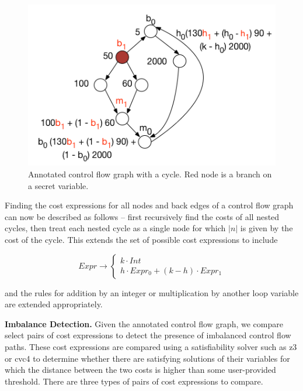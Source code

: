 \begin{figure}
  \includegraphics[scale=.5]{imbalance.png}
  \caption{Annotated control flow graph with a cycle. Red node is a branch on a secret variable.}
  \label{fig:imb}
\end{figure}

Finding the cost expressions for all nodes and back edges of a control flow graph can now be described as follows -- first recursively find the costs of all nested cycles, then treat each nested cycle as a single node for which $|n|$ is given by the cost of the cycle. This extends the set of possible cost expressions to include 

$$Expr \rightarrow \begin{cases} k \cdot Int  \\ h \cdot Expr_{0} + (k - h) \cdot Expr_{1} \end{cases}$$

and the rules for addition by an integer or multiplication by another loop variable are extended appropriately. 
 
\textbf{Imbalance Detection.} Given the annotated control flow graph, we compare select pairs of cost expressions to detect the presence of imbalanced control flow paths. These cost expressions are compared using a satisfiability solver such as z3 \cite{z3} or cvc4 \cite{cvc4} to determine whether there are satisfying solutions of their variables for which the distance between the two costs is higher than some user-provided threshold. There are three types of pairs of cost expressions to compare. 

